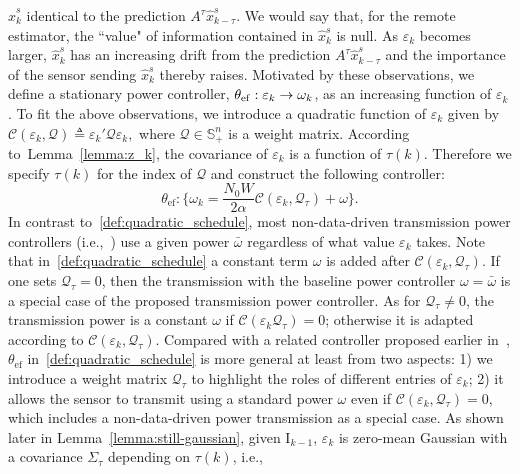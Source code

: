 \documentclass[twocolumn]{autart}    \usepackage{cite}
\begin{document}
{{$\hat x_k^s$ identical to the prediction $A^\tau \hat x_{k-\tau}^s$. We would say that, for the remote estimator, the
 ``value" of information contained in $\hat x_k^s$ is null.
As $\varepsilon_k$ becomes larger,
$\hat x_k^s$ has an increasing drift
from the prediction $A^\tau \hat x_{k-\tau}^s$ and the importance of the sensor sending $\hat x_k^s$ thereby
raises. Motivated by these observations, we define a stationary power controller, $\theta_{\rm ef}:\varepsilon_k\rightarrow \omega_k$,
as an increasing function
of $\varepsilon_k$. To fit the above observations, we introduce a quadratic function of $\varepsilon_k$ given by
$\mathcal{C}(\varepsilon_k,\mathcal{Q})\triangleq {\varepsilon_k}'\mathcal{Q}\varepsilon_k,$
where $\mathcal{Q}\in \mathbb{S}_+^n$ is a weight matrix.
According to~Lemma~\ref{lemma:z_k},
the covariance of $\varepsilon_k$ is a function of $\tau(k)$.
Therefore we specify $\tau(k)$ for the index
of $\mathcal{Q}$
and construct the following controller:
\begin{equation}\label{def:quadratic_schedule}
  \theta_{\text{ef}}: \{\omega_k=\frac{N_0W}{2\alpha}
  \mathcal{C}(\varepsilon_k,\mathcal{Q}_\tau)+
  \omega\}.
\end{equation}
In contrast to~\eqref{def:quadratic_schedule}, most non-data-driven transmission power controllers
(i.e.,~\cite{queahl10,leong2012power})
use a given power $\bar \omega$
regardless of what value $\varepsilon_k$ takes.
Note that in~\eqref{def:quadratic_schedule} a constant term $\omega$ is added
after $\mathcal{C}(\varepsilon_k, \mathcal{Q}_\tau)$.
If one sets $\mathcal{Q}_\tau=0$, then the transmission
with the baseline power controller $\omega=\bar \omega$ is a special case of the proposed
transmission power controller.
As for $\mathcal{Q}_\tau\not=0$,
the transmission power is a constant $\omega$ if $\mathcal{C}(\varepsilon_k \mathcal{Q}_\tau)= 0$; otherwise it is adapted according to $\mathcal{C}(\varepsilon_k,\mathcal{Q}_\tau)$.
{Compared with a related controller proposed earlier
in~\cite{Liyuzhe13CDC}, $\theta_{\text{ef}}$ in~\eqref{def:quadratic_schedule} is more general at least
from two aspects: 1) we introduce a weight matrix $\mathcal{Q}_\tau$ to highlight
the roles of different entries of $\varepsilon_k$; 2) it allows
the sensor to transmit using a standard power $\omega$ even
if $\mathcal{C}(\varepsilon_k, \mathcal{Q}_\tau)= 0$, which
includes a non-data-driven power transmission as a special case.}
As shown later in Lemma~\ref{lemma:still-gaussian}, given
$\mathrm{I}_{k-1}$,
$\varepsilon_k$ is zero-mean Gaussian with a
covariance $\Sigma_\tau$ depending on $\tau(k)$, i.e.,
}}
\end{document}
